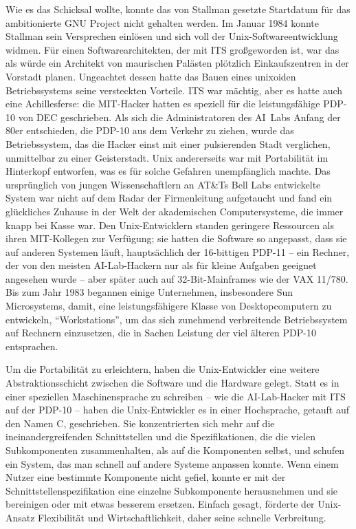 Wie es das Schicksal wollte, konnte das von Stallman gesetzte Startdatum für das ambitionierte GNU Project nicht gehalten werden. Im Januar 1984 konnte Stallman sein Versprechen einlösen und sich voll der Unix-Softwareentwicklung widmen. Für einen Softwarearchitekten, der mit ITS großgeworden ist, war das als würde ein Architekt von maurischen Palästen plötzlich Einkaufszentren in der Vorstadt planen. Ungeachtet dessen hatte das Bauen eines unixoiden Betriebssystems seine versteckten Vorteile. ITS war mächtig, aber es hatte auch eine Achillesferse: die MIT-Hacker hatten es speziell für die leistungsfähige PDP-10 von DEC geschrieben. Als sich die Administratoren des AI~Labs Anfang der 80er entschieden, die PDP-10 aus dem Verkehr zu ziehen, wurde das Betriebssystem, das die Hacker einst mit einer pulsierenden Stadt verglichen, unmittelbar zu einer Geisterstadt. Unix andererseits war mit Portabilität im Hinterkopf entworfen, was es für solche Gefahren unempfänglich machte. Das ursprünglich von jungen Wissenschaftlern an AT\&Ts Bell Labs entwickelte System war nicht auf dem Radar der Firmenleitung aufgetaucht und fand ein glückliches Zuhause in der Welt der akademischen Computersysteme, die immer knapp bei Kasse war. Den Unix-Entwicklern standen geringere Ressourcen als ihren MIT-Kollegen zur Verfügung; sie hatten die Software so angepasst, dass sie auf anderen Systemen läuft, hauptsächlich der 16-bittigen PDP-11 – ein Rechner, der von den meisten AI-Lab-Hackern nur als für kleine Aufgaben geeignet angesehen wurde – aber später auch auf 32-Bit-Mainframes wie der VAX 11/780. Bis zum Jahr 1983 begannen einige Unternehmen, insbesondere Sun Microsystems, damit, eine leistungsfähigere Klasse von Desktopcomputern zu entwickeln, "`Workstations"', um das sich zunehmend verbreitende  Betriebssystem auf Rechnern einzusetzen, die in Sachen Leistung der viel älteren PDP-10 entsprachen.

Um die Portabilität zu erleichtern, haben die Unix-Entwickler eine weitere Abstraktionsschicht zwischen die Software und die Hardware gelegt. Statt es in einer speziellen Maschinensprache zu schreiben – wie die AI-Lab-Hacker mit ITS auf der PDP-10 – haben die Unix-Entwickler es in einer Hochsprache, getauft auf den Namen C, geschrieben. Sie konzentrierten sich mehr auf die ineinandergreifenden Schnittstellen und die Spezifikationen, die die vielen Subkomponenten zusammenhalten, als auf die Komponenten selbst, und schufen ein System, das man schnell auf andere Systeme anpassen konnte. Wenn einem Nutzer eine bestimmte Komponente nicht gefiel, konnte er mit der Schnittstellenspezifikation eine einzelne Subkomponente herausnehmen und sie bereinigen oder mit etwas besserem ersetzen. Einfach gesagt, förderte der Unix-Ansatz Flexibilität und Wirtschaftlichkeit, daher seine schnelle Verbreitung. 

